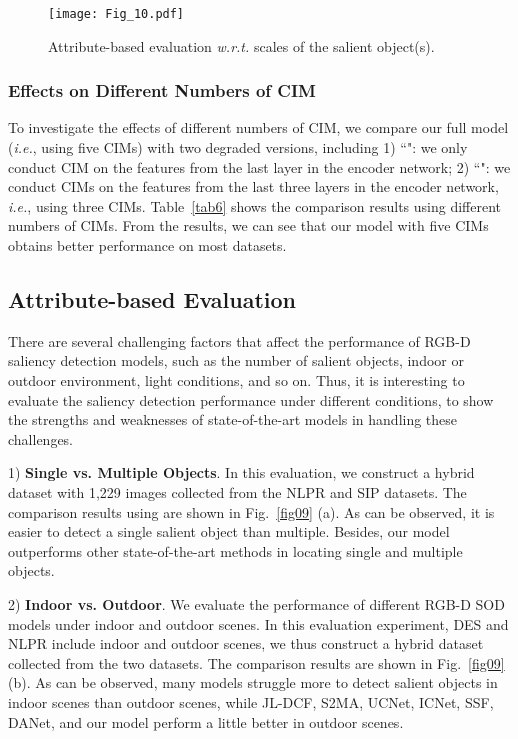 \documentclass[10pt,twocolumn,letterpaper]{article}
\def\ie{\emph{i.e.}}
\begin{document}
\begin{figure*}
	\begin{centering}
		\texttt{[image: Fig\_10.pdf]}\caption{Attribute-based evaluation \emph{w.r.t.} scales of the salient object(s).}\vspace{-0.35cm}
		\label{fig010}
	\end{centering}
\end{figure*}



\subsubsection{Effects on Different Numbers of CIM}
\label{cim_ablation}

To investigate the effects of different numbers of CIM, we compare our full model (\ie, using five CIMs) with two degraded versions, including 1) ``": we only conduct CIM on the features from the last layer in the encoder network; 2) ``": we conduct CIMs on the features from the last three layers in the encoder network, \ie, using three CIMs. Table~\ref{tab6} shows the comparison results using different numbers of CIMs. From the results, we can see that our model with five CIMs obtains better performance on most datasets.




\subsection{Attribute-based Evaluation}
\label{attribute}

There are several challenging factors that affect the performance of RGB-D saliency detection models, such as the number of salient objects, indoor or outdoor environment, light conditions, and so on. Thus, it is interesting to evaluate the saliency detection performance under different conditions, to show the strengths and weaknesses of state-of-the-art models in handling these challenges.


1) \textbf{Single vs. Multiple Objects}. In this evaluation, we construct a hybrid dataset with 1,229 images collected from the NLPR \cite{peng2014rgbd} and SIP \cite{fan2019rethinking} datasets. The comparison results using  are shown in Fig.~\ref{fig09} (a). As can be observed, it is easier to detect a single salient object than multiple. Besides, our model outperforms other state-of-the-art methods in locating single and multiple objects.

2) \textbf{Indoor vs. Outdoor}. We evaluate the performance of different RGB-D SOD models under indoor and outdoor scenes. In this evaluation experiment, DES \cite{cheng2014depth} and NLPR \cite{peng2014rgbd} include indoor and outdoor scenes, we thus construct a hybrid dataset collected from the two datasets. The comparison results are shown in Fig.~\ref{fig09} (b). As can be observed, many models struggle more to detect salient objects in indoor scenes than outdoor scenes, while JL-DCF, S2MA, UCNet, ICNet, SSF, DANet, and our model perform a little better in outdoor scenes.
\end{document}
